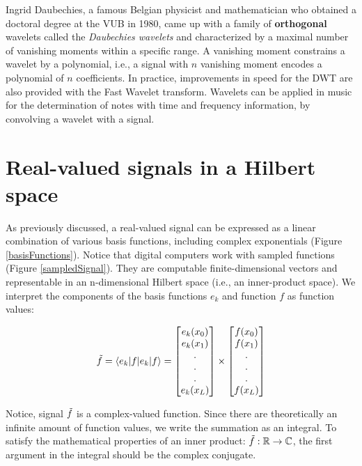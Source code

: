 Ingrid Daubechies, a famous Belgian physicist and mathematician who obtained a doctoral degree at the VUB in 1980, came up with a family of \textbf{orthogonal} wavelets called the \textit{Daubechies wavelets} and characterized by a maximal number of vanishing moments within a specific range. A vanishing moment constrains a wavelet by a polynomial, i.e., a signal with $n$ vanishing moment encodes a polynomial of $n$ coefficients. In practice, improvements in speed for the DWT are also provided with the Fast Wavelet transform. Wavelets can be applied in music for the determination of notes with time and frequency information, by convolving a wavelet with a signal.



\section{Real-valued signals in a Hilbert space }
As previously discussed, a real-valued signal can be expressed as a linear combination of various basis functions, including complex exponentials (Figure \ref{basisFunctions}). Notice that digital computers work with sampled functions (Figure \ref{sampledSignal}). They are computable finite-dimensional vectors and representable in an n-dimensional Hilbert space (i.e., an inner-product space). We interpret the components of the basis functions $e_k$ and function $f$ as function values:



\begin{equation}
     \Tilde{f} = \braket{e_k | f} =
     \begin{bmatrix}
         e_k(x_0) \\ 
         e_k(x_1) \\
         . \\
         . \\ 
         . \\
         e_k(x_L)
     \end{bmatrix}
     \times
     \begin{bmatrix}
         f(x_0) \\ 
         f(x_1) \\
         . \\
         . \\ 
         . \\
         f(x_L)
     \end{bmatrix}
\end{equation}

Notice, signal $\Tilde{f}$ is a complex-valued function. Since there are theoretically an infinite amount of function values, we write the summation as an integral. To satisfy the mathematical properties of an inner product: $\Tilde{f}: \mathbb{R} \rightarrow \mathbb{C}$, the first argument in the integral should be the complex conjugate.

